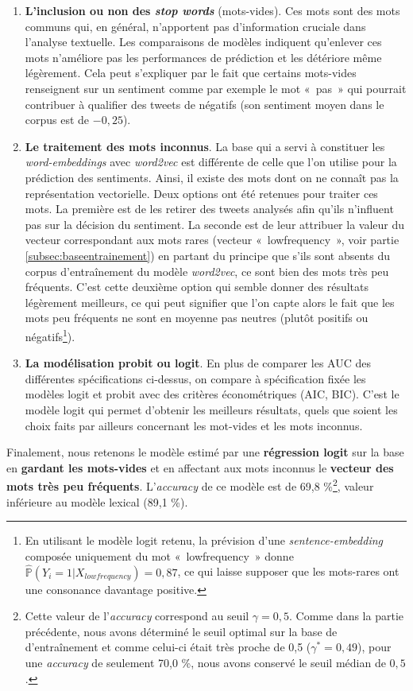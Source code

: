 \documentclass[11pt,french,french]{article}
\let\rmarkdownfootnote\footnote%
\def\footnote{\protect\rmarkdownfootnote}
\begin{document}
\begin{enumerate}
\item \textbf{L’inclusion ou non des \emph{stop words}} (mots-vides). 
Ces mots sont des mots communs qui, en général, n’apportent pas d’information cruciale dans l’analyse textuelle. 
Les comparaisons de modèles indiquent qu’enlever ces mots n’améliore pas les performances de prédiction et les détériore même légèrement. 
Cela peut s’expliquer par le fait que certains mots-vides renseignent sur un sentiment comme par exemple le mot « pas » qui pourrait contribuer à qualifier des tweets de négatifs (son sentiment moyen dans le corpus est de $-0,25$).

\item \textbf{Le traitement des mots inconnus}. 
La base qui a servi à constituer les \emph{word-embeddings} avec \emph{word2vec} est différente de celle que l'on utilise pour la prédiction des sentiments.
Ainsi, il existe des mots dont on ne connaît pas la représentation vectorielle. 
Deux options ont été retenues pour traiter ces mots. 
La première est de les retirer des tweets analysés afin qu'ils n’influent pas sur la décision du sentiment. 
La seconde est de leur attribuer la valeur du vecteur correspondant aux mots rares (vecteur « lowfrequency », voir partie \ref{subsec:baseentrainement}) en partant du principe que s'ils sont absents du corpus d'entraînement du modèle \emph{word2vec}, ce sont bien des mots très peu fréquents. 
C’est cette deuxième option qui semble donner des résultats légèrement meilleurs, ce qui peut signifier que l’on capte alors le fait que les mots peu fréquents ne sont en moyenne pas neutres (plutôt positifs ou négatifs\footnote{En utilisant le modèle logit retenu, la prévision d'une \emph{sentence-embedding} composée uniquement du mot « lowfrequency » donne $\widehat{\mathbb{P}}(Y_i = 1 | X_{lowfrequency}) = 0,87$, ce qui laisse supposer que les mots-rares ont une consonance davantage positive.}). 

\item \textbf{La modélisation probit ou logit}. En plus de comparer les AUC des différentes spécifications ci-dessus, on compare à spécification fixée les modèles logit et probit avec des critères économétriques (AIC, BIC). C’est le modèle logit qui permet d’obtenir les meilleurs résultats, quels que soient les choix faits par ailleurs concernant les mot-vides et les mots inconnus.

\end{enumerate}

Finalement, nous retenons le modèle estimé par une \textbf{régression
logit} sur la base en \textbf{gardant les mots-vides} et en affectant
aux mots inconnus le \textbf{vecteur des mots très peu fréquents}.
L'\emph{accuracy} de ce modèle est de 69,8 \%\footnote{Cette valeur de
  l'\emph{accuracy} correspond au seuil \(\gamma = 0,5\). Comme dans la
  partie précédente, nous avons déterminé le seuil optimal sur la base
  de d'entraînement et comme celui-ci était très proche de 0,5
  (\(\gamma^* = 0,49\)), pour une \emph{accuracy} de seulement 70,0 \%,
  nous avons conservé le seuil médian de \(0,5\).}, valeur inférieure au
modèle lexical (89,1 \%).
\end{document}
